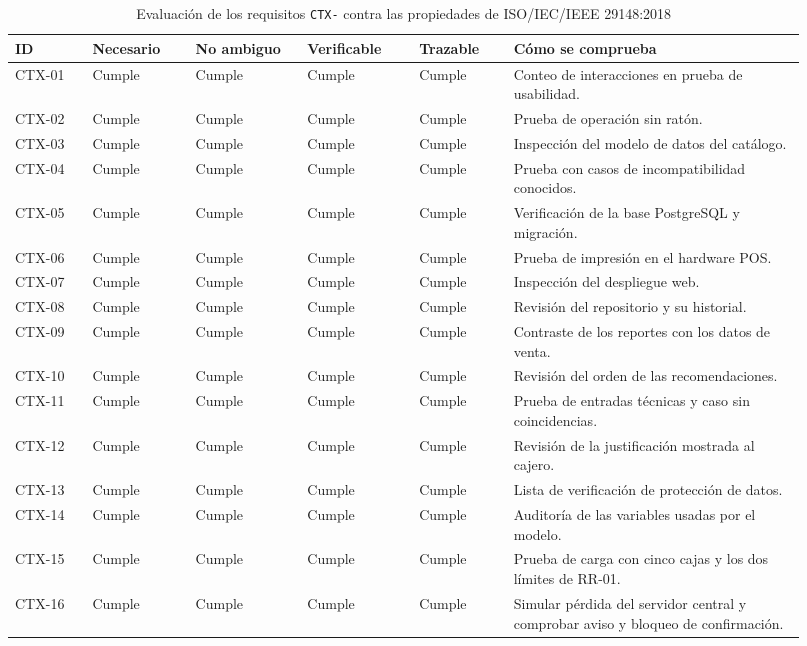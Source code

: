 \documentclass[onecolumn,12pt,a4paper]{IEEEtran}
\begin{document}
\begingroup
\setlength{\tabcolsep}{3pt}
\begin{table}[htbp]
\caption{Evaluaci\'on de los requisitos \texttt{CTX-} contra las propiedades de ISO/IEC/IEEE 29148:2018}
\label{tab:ctx}
\centering
\footnotesize
\begin{tabular}{@{}p{0.09\linewidth}p{0.12\linewidth}p{0.13\linewidth}p{0.13\linewidth}p{0.11\linewidth}p{0.34\linewidth}@{}}
\toprule
\textbf{ID} & \textbf{Necesario} & \textbf{No ambiguo} & \textbf{Verificable} & \textbf{Trazable} & \textbf{C\'omo se comprueba}\\
\midrule
CTX-01 & Cumple & Cumple & Cumple & Cumple & Conteo de interacciones en prueba de usabilidad.\\
CTX-02 & Cumple & Cumple & Cumple & Cumple & Prueba de operaci\'on sin rat\'on.\\
CTX-03 & Cumple & Cumple & Cumple & Cumple & Inspecci\'on del modelo de datos del cat\'alogo.\\
CTX-04 & Cumple & Cumple & Cumple & Cumple & Prueba con casos de incompatibilidad conocidos.\\
CTX-05 & Cumple & Cumple & Cumple & Cumple & Verificaci\'on de la base PostgreSQL y migraci\'on.\\
CTX-06 & Cumple & Cumple & Cumple & Cumple & Prueba de impresi\'on en el hardware POS.\\
CTX-07 & Cumple & Cumple & Cumple & Cumple & Inspecci\'on del despliegue web.\\
CTX-08 & Cumple & Cumple & Cumple & Cumple & Revisi\'on del repositorio y su historial.\\
CTX-09 & Cumple & Cumple & Cumple & Cumple & Contraste de los reportes con los datos de venta.\\
CTX-10 & Cumple & Cumple & Cumple & Cumple & Revisi\'on del orden de las recomendaciones.\\
CTX-11 & Cumple & Cumple & Cumple & Cumple & Prueba de entradas t\'ecnicas y caso sin coincidencias.\\
CTX-12 & Cumple & Cumple & Cumple & Cumple & Revisi\'on de la justificaci\'on mostrada al cajero.\\
CTX-13 & Cumple & Cumple & Cumple & Cumple & Lista de verificaci\'on de protecci\'on de datos.\\
CTX-14 & Cumple & Cumple & Cumple & Cumple & Auditor\'ia de las variables usadas por el modelo.\\
CTX-15 & Cumple & Cumple & Cumple & Cumple & Prueba de carga con cinco cajas y los dos l\'imites de RR-01.\\
CTX-16 & Cumple & Cumple & Cumple & Cumple & Simular p\'erdida del servidor central y comprobar aviso y bloqueo de confirmaci\'on.\\
\bottomrule
\end{tabular}
\end{table}
\endgroup
\end{document}
